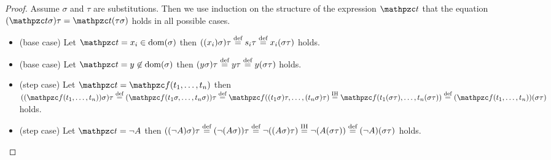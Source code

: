 \begin{proof}
	Assume $\sigma$ and $\tau$ are substitutions.
	Then we use induction on the structure of the 	expression $\mct$
	that the equation $(\mct\sigma)\tau =  \mct(\tau\sigma)$ holds in all possible cases.
	\begin{itemize}
		\item (base case) Let $\mct = x_i \in\domain(\sigma)$ then
		$((x_i)\sigma)\tau\defEQ s_i\tau\defEQ x_i(\sigma\tau)$ holds.

		\item (base case) Let $\mct = y \not\in\domain(\sigma)$ then
		$(y\sigma)\tau \defEQ y\tau \defEQ y(\sigma\tau)$ holds.

		\item (step case) Let $\mct = \mcf(t_1,\ldots,t_n)$
		then
		$((\mcf(t_1,\ldots,t_n))\sigma)\tau
		\defEQ
		(\mcf(t_1\sigma,\ldots,t_n\sigma))\tau
		\defEQ
		\mcf((t_1\sigma)\tau,\ldots,(t_n\sigma)\tau)
		\defEQ[IH]
		\mcf(t_1(\sigma\tau),\ldots,t_n(\sigma\tau))
		\defEQ
		(\mcf(t_1,\ldots,t_n))(\sigma\tau)
		$ holds.

		\item (step case) Let $\mct = \lnot A$ then
		$((\lnot A)\sigma)\tau
		\defEQ
		(\lnot(A\sigma))\tau
		\defEQ
		\lnot((A\sigma)\tau)
		\defEQ[IH]
		\lnot(A(\sigma\tau))
		\defEQ
		(\lnot A)(\sigma\tau)
		$ holds.
	\end{itemize}
\end{proof}
